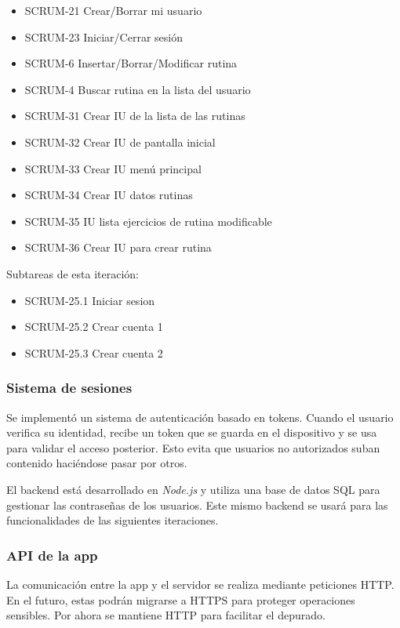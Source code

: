 \begin{itemize}
  \item SCRUM-21 Crear/Borrar mi usuario
  \item SCRUM-23 Iniciar/Cerrar sesión
  \item SCRUM-6 Insertar/Borrar/Modificar rutina
  \item SCRUM-4 Buscar rutina en la lista del usuario
  \item SCRUM-31 Crear IU de la lista de las rutinas
  \item SCRUM-32 Crear IU de pantalla inicial
  \item SCRUM-33 Crear IU menú principal
  \item SCRUM-34 Crear IU datos rutinas
  \item SCRUM-35 IU lista ejercicios de rutina modificable
  \item SCRUM-36 Crear IU para crear rutina
\end{itemize}

Subtareas de esta iteración:

\begin{itemize}
	\item SCRUM-25.1 Iniciar sesion
	\item SCRUM-25.2 Crear cuenta 1
	\item SCRUM-25.3 Crear cuenta 2
\end{itemize}

\subsubsection*{Sistema de sesiones}
Se implement\'o un sistema de autenticaci\'on basado en tokens. Cuando el usuario verifica su identidad, recibe un token que se guarda en el dispositivo y se usa para validar el acceso posterior. Esto evita que usuarios no autorizados suban contenido haci\'endose pasar por otros.

El backend est\'a desarrollado en \textit{Node.js} y utiliza una base de datos SQL para gestionar las contrase\~nas de los usuarios. Este mismo backend se usar\'a para las funcionalidades de las siguientes iteraciones.

\subsubsection*{API de la app}
La comunicaci\'on entre la app y el servidor se realiza mediante peticiones HTTP. En el futuro, estas podr\'an migrarse a HTTPS para proteger operaciones sensibles. Por ahora se mantiene HTTP para facilitar el depurado.

